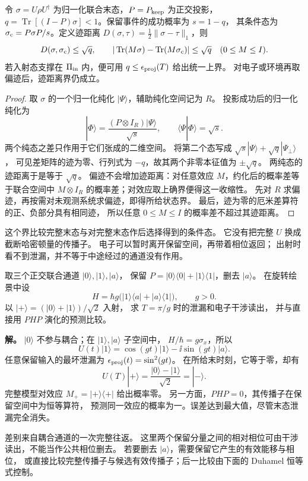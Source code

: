 \begin{proposition}[末态后选择的成功概率与状态误差]
令 $\sigma=U\rho U^\dagger$ 为归一化联合末态，$P=P_{\rm keep}$ 为正交投影，
$q=\operatorname{Tr}[(I-P)\sigma]<1$。保留事件的成功概率为 $s=1-q$，
其条件态为 $\sigma_{\rm c}=P\sigma P/s$。定义迹距离
$D(\sigma,\tau)=\tfrac12\|\sigma-\tau\|_1$，则
\[
D(\sigma,\sigma_{\rm c})\le\sqrt q,\qquad
|\operatorname{Tr}(M\sigma)-\operatorname{Tr}(M\sigma_{\rm c})|
\le\sqrt q\quad(0\le M\le I).
\]
若入射态支撑在 $\Pi_{\rm in}$ 内，便可用
$q\le\epsilon_{\rm proj}(T)$ 给出统一上界。
对电子或环境再取偏迹后，迹距离界仍成立。
\end{proposition}
\begin{proof}
取 $\sigma$ 的一个归一化纯化 $|\Psi\rangle$，辅助纯化空间记为 $R$。
投影成功后的归一化纯化为
\[
|\Phi\rangle=\frac{(P\otimes I_R)|\Psi\rangle}{\sqrt s},\qquad
\langle\Psi|\Phi\rangle=\sqrt s.
\]
两个纯态之差只作用于它们张成的二维空间。
将第二个态写成 $\sqrt s|\Psi\rangle+\sqrt q|\Psi_\perp\rangle$，
可见差矩阵的迹为零、行列式为 $-q$，故其两个非零本征值为 $\pm\sqrt q$。
两纯态的迹距离于是等于 $\sqrt q$。
偏迹不会增加迹距离：对任意效应 $M$，约化后的概率差等于联合空间中
$M\otimes I_R$ 的概率差；对效应取上确界便得这一收缩性。
先对 $R$ 求偏迹，再按需对未观测系统求偏迹，即得所给状态界。
最后，迹为零的厄米差算符的正、负部分具有相同迹，
所以任意 $0\le M\le I$ 的概率差不超过其迹距离。
\end{proof}

这个界比较完整末态与对完整末态作后选择得到的条件态。
它没有把完整 $U$ 换成截断哈密顿量的传播子。
电子可以暂时离开保留空间，再带着相位返回；
出射时看不到泄漏，并不等于中途经过的通道没有作用。

\begin{exbox}[零末态泄漏仍会改变干涉相位]
取三个正交联合通道 $|0\rangle,|1\rangle,|a\rangle$，
保留 $P=|0\rangle\langle0|+|1\rangle\langle1|$，删去 $|a\rangle$。
在旋转绘景中设
\[
H=\hbar g\bigl(|1\rangle\langle a|+|a\rangle\langle1|\bigr),\qquad g>0.
\]
以 $|+\rangle=(|0\rangle+|1\rangle)/\sqrt2$ 入射，
求 $T=\pi/g$ 时的泄漏和电子干涉读出，
并与直接用 $PHP$ 演化的预测比较。

\textbf{解。} $|0\rangle$ 不参与耦合；在 $|1\rangle,|a\rangle$ 子空间中，
$H/\hbar=g\sigma_x$，所以
\[
U(t)|1\rangle=\cos(gt)|1\rangle-\ii\sin(gt)|a\rangle.
\]
任意保留输入的最坏泄漏为 $\epsilon_{\rm proj}(t)=\sin^2(gt)$。
在所给末时刻，它等于零，却有
\[
U(T)|+\rangle=\frac{|0\rangle-|1\rangle}{\sqrt2}=| -\rangle.
\]
完整模型对效应 $M_+=|+\rangle\langle+|$ 给出概率零。
另一方面，$PHP=0$，其传播子在保留空间中为恒等算符，
预测同一效应的概率为一。误差达到最大值，尽管末态泄漏完全消失。

差别来自耦合通道的一次完整往返。
这里两个保留分量之间的相对相位可由干涉读出，不能当作公共相位删去。
若要删去 $|a\rangle$，需要保留它产生的有效能移与相位，
或直接比较完整传播子与候选有效传播子；后一比较由下面的 Duhamel 恒等式控制。
\end{exbox}
